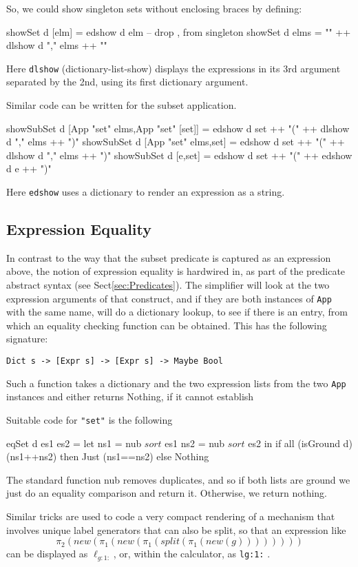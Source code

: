So, we could show singleton sets without enclosing braces
by defining:
\begin{code}
showSet d [elm] = edshow d elm      -- drop {,} from singleton
showSet d elms = "{" ++ dlshow d "," elms ++ "}"
\end{code}
Here \texttt{dlshow} (dictionary-list-show) displays the expressions
in its 3rd argument separated by the 2nd,
using its first dictionary argument.

Similar code can be written for the subset application.
\begin{code}
showSubSet d [App "set" elms,App "set" [set]]
 = edshow d set ++ "(" ++ dlshow d "," elms ++ ")"
showSubSet d [App "set" elms,set]
 = edshow d set ++ "(" ++ dlshow d "," elms ++ ")"
showSubSet d [e,set]
 = edshow d set ++ "(" ++ edshow d e ++ ")"
\end{code}
Here \texttt{edshow} uses a dictionary to render an expression as a string.

\subsection{Expression Equality}

In contrast to the way that the subset predicate
is captured as an expression above,
the notion of expression equality is hardwired in,
as part of the predicate abstract syntax (see Sect\ref{sec:Predicates}).
The simplifier will look at the two expression
arguments of that construct,
and if they are both instances of \texttt{App} with the same name,
will do a dictionary lookup, to see if there
is an entry, from
which an equality checking function can be obtained.
This has the following signature:
\begin{verbatim}
Dict s -> [Expr s] -> [Expr s] -> Maybe Bool
\end{verbatim}
Such a function takes a dictionary and the two expression
lists from the two \texttt{App} instances
and either returns Nothing, if it cannot establish

Suitable code for \verb$"set"$ is the following
\begin{code}
eqSet d es1 es2
 = let ns1 = nub $ sort $ es1
       ns2 = nub $ sort $ es2
   in if all (isGround d) (ns1++ns2)
      then Just (ns1==ns2)
      else Nothing
\end{code}
The standard function nub removes duplicates,
and so if both lists are ground we just do an equality comparison
and return it. Otherwise, we return nothing.


Similar tricks are used to code a very compact rendering
of a mechanism that involves unique label generators
that can also be split, so that an expression like
\[
 \pi_2(new(\pi_1(new(\pi_1(split(\pi_1(new(g))))))))
\]
can be displayed as $\ell_{g:1:}$, or,
within the calculator, as \texttt{lg:1:} .


